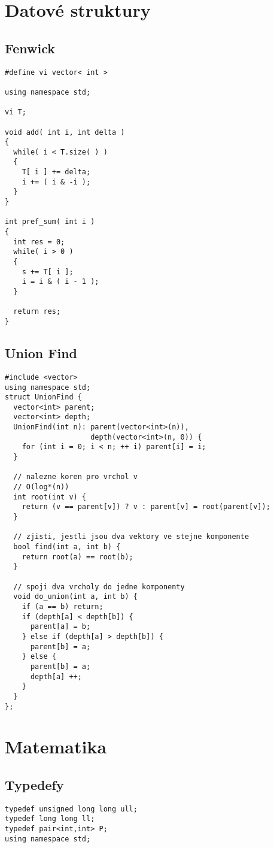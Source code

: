 \documentclass{article}
\begin{document}
\newpage

\section{Datové struktury}

\subsection{Fenwick}
\begin{lstlisting}
#define vi vector< int >

using namespace std;

vi T;

void add( int i, int delta )
{
  while( i < T.size( ) )
  {
    T[ i ] += delta;
    i += ( i & -i );
  }
}

int pref_sum( int i )
{
  int res = 0;
  while( i > 0 )
  {
    s += T[ i ];
    i = i & ( i - 1 );
  }

  return res;
}
\end{lstlisting}

\subsection{Union Find}
\begin{lstlisting}
#include <vector>
using namespace std;
struct UnionFind {
  vector<int> parent;
  vector<int> depth;
  UnionFind(int n): parent(vector<int>(n)), 
                    depth(vector<int>(n, 0)) {
    for (int i = 0; i < n; ++ i) parent[i] = i;
  }

  // nalezne koren pro vrchol v
  // O(log*(n))
  int root(int v) {
    return (v == parent[v]) ? v : parent[v] = root(parent[v]);
  }

  // zjisti, jestli jsou dva vektory ve stejne komponente
  bool find(int a, int b) {
    return root(a) == root(b);
  }

  // spoji dva vrcholy do jedne komponenty
  void do_union(int a, int b) {
    if (a == b) return;
    if (depth[a] < depth[b]) {
      parent[a] = b;
    } else if (depth[a] > depth[b]) {
      parent[b] = a;
    } else {
      parent[b] = a;
      depth[a] ++;
    }
  }
};
\end{lstlisting}

\newpage
\section{Matematika}

\subsection{Typedefy}
\begin{lstlisting}
typedef unsigned long long ull;
typedef long long ll;
typedef pair<int,int> P;
using namespace std;
\end{lstlisting}
\end{document}
